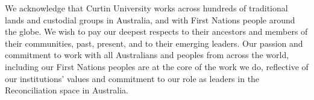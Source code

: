 We acknowledge that Curtin University works across hundreds of traditional lands and custodial groups in Australia, and with First Nations people around the globe. We wish to pay our deepest respects to their ancestors and members of their communities, past, present, and to their emerging leaders. Our passion and commitment to work with all Australians and peoples from across the world, including our First Nations peoples are at the core of the work we do, reflective of our institutions' values and commitment to our role as leaders in the Reconciliation space in Australia.